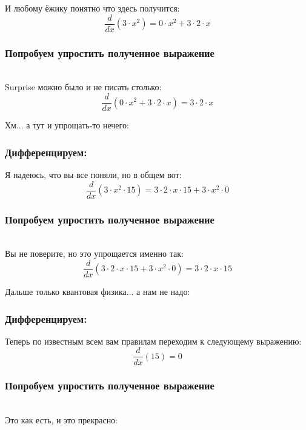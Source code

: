 \documentclass[a4paper,12pt]{article}
\begin{document}
И любому ёжику понятно что здесь получится:
\begin{dmath}\frac{d}{dx}\left(3\cdot x^{2}\right)=0\cdot x^{2}+ 3\cdot 2\cdot x\end{dmath}
\subsubsection*{Попробуем упростить полученное выражение}
\\Surprise можно было и не писать столько:\\
\begin{dmath}
	\frac{d}{dx}\left(0\cdot x^{2}+ 3\cdot 2\cdot x\right) = 3\cdot 2\cdot x\end{dmath}

Хм... а тут и упрощать-то нечего:

\subsubsection*{Дифференцируем:}

Я надеюсь, что вы все поняли, но в общем вот:
\begin{dmath}\frac{d}{dx}\left(3\cdot x^{2}\cdot 15\right)=3\cdot 2\cdot x\cdot 15+ 3\cdot x^{2}\cdot 0\end{dmath}
\subsubsection*{Попробуем упростить полученное выражение}
\\Вы не поверите, но это упрощается именно так:\\
\begin{dmath}
	\frac{d}{dx}\left(3\cdot 2\cdot x\cdot 15+ 3\cdot x^{2}\cdot 0\right) = 3\cdot 2\cdot x\cdot 15\end{dmath}

Дальше только квантовая физика... а нам не надо:

\subsubsection*{Дифференцируем:}

Теперь по известным всем вам правилам переходим к следующему выражению:
\begin{dmath}\frac{d}{dx}\left(15\right)=0\end{dmath}
\subsubsection*{Попробуем упростить полученное выражение}
\\Это как есть, и это прекрасно:
\end{document}
